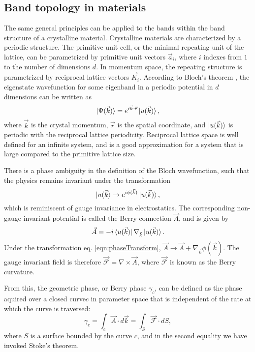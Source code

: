 \subsection{Band topology in materials}
The same general principles can be applied to the bands within the band structure of a crystalline material. Crystalline materials are characterized by a periodic structure. The primitive unit cell, or the minimal repeating unit of the lattice, can be parametrized by primitive unit vectors $\vec{a}_i$, where $i$ indexes from $1$ to the number of dimensions $d$. In momentum space, the repeating structure is parametrized by reciprocal lattice vectors $\vec{K}_i$. According to Bloch's theorem \cite{Ashcroft}, the eigenstate wavefunction for some eigenband in a periodic potential in $d$ dimensions can be written as 
\begin{equation}
\mathinner{|{\Psi(\vec{k})}\rangle} = e^{i\vec{k}\cdot\vec{r}}\mathinner{|{u(\vec{k})}\rangle},
\end{equation}
where $\vec{k}$ is the crystal momentum, $\vec{r}$ is the spatial coordinate, and $\mathinner{|{u(\vec{k})}\rangle}$ is periodic with the reciprocal lattice periodicity. Reciprocal lattice space is well defined for an infinite system, and is a good approximation for a system that is large compared to the primitive lattice size.

There is a phase ambiguity in the definition of the Bloch wavefunction, such that the physics remains invariant under the transformation 
\begin{equation}
\mathinner{|{u(\vec{k}}\rangle} \rightarrow e^{i\phi(\vec{k})}\mathinner{|{u(\vec{k})}\rangle},
\label{eqn:phaseTransform}
\end{equation}
which is reminiscent of gauge invariance in electrostatics. The corresponding non-gauge invariant potential is called the Berry connection $\vec{A}$, and is given by 
\begin{equation}
\vec{A}=-i\mathinner{\langle{u(\vec{k})}|}\nabla_{\vec{k}}\mathinner{|{u(\vec{k})}\rangle}.
\end{equation}
Under the transformation eq. \ref{eqn:phaseTransform}, $\vec{A} \rightarrow \vec{A} + \nabla_{\vec{k}}\phi(\vec{k})$. The gauge invariant field is therefore $\vec{\mathcal{F}}=\nabla\times\vec{A}$, where $\vec{\mathcal{F}}$ is known as the Berry curvature. 

From this, the geometric phase, or Berry phase $\gamma_c$, can be defined as the phase aquired over a closed curve$c$  in parameter space that is independent of the rate at which the curve is traversed:
\begin{equation}
\gamma_c = \int_c \vec{A}\cdot d\vec{k} = \int_S \vec{\mathcal{F}}\cdot dS,
\end{equation}
where $S$ is a surface bounded by the  curve $c$, and in the second equality we have invoked Stoke's theorem. 


